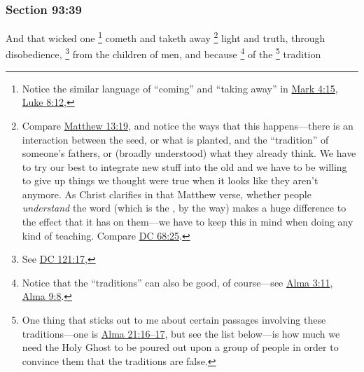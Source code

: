 	\subsubsection{Section 93:39} %
		\label{DC93-39}

		And that wicked one
			\footnote{%
				Notice the similar language of ``coming'' and ``taking away'' in \hyperref[MARK-4-15]{Mark 4:15}, \hyperref[LUKE-8-12]{Luke 8:12}, 
				}%
		cometh and taketh away%
			\footnote{%
				Compare \hyperref[MATTHEW-13-19]{Matthew 13:19}, and notice the ways that this happens---there is an interaction between the seed, or what is planted, and the ``tradition'' of someone's fathers, or (broadly understood) what they already think. We have to try our best to integrate new stuff into the old and we have to be willing to give up things we thought were true when it looks like they aren't anymore. As Christ clarifies in that Matthew verse, whether people \textit{understand} the word (which is the , by the way) makes a huge difference to the effect that it has on them---we have to keep this in mind when doing any kind of teaching. Compare \hyperref[DC68-25]{DC 68:25}.
				}
		light and truth, through disobedience,%
			\footnote{%
				See \hyperref[DC121-17]{DC 121:17}, 
				}
		from the children of men, and because%
			\footnote{%
				Notice that the ``traditions'' can also be good, of course---see \hyperref[ALMA-3-11]{Alma 3:11}, \hyperref[ALMA-9-8]{Alma 9:8}.
				}
		of the
			\footnote{%
				One thing that sticks out to me about certain passages involving these traditions---one is \hyperref[ALMA-21-16]{Alma 21:16--17}, but see the list below---is how much we need the Holy Ghost to be poured out upon a group of people in order to convince them that the traditions are false.
				}%
		tradition%
